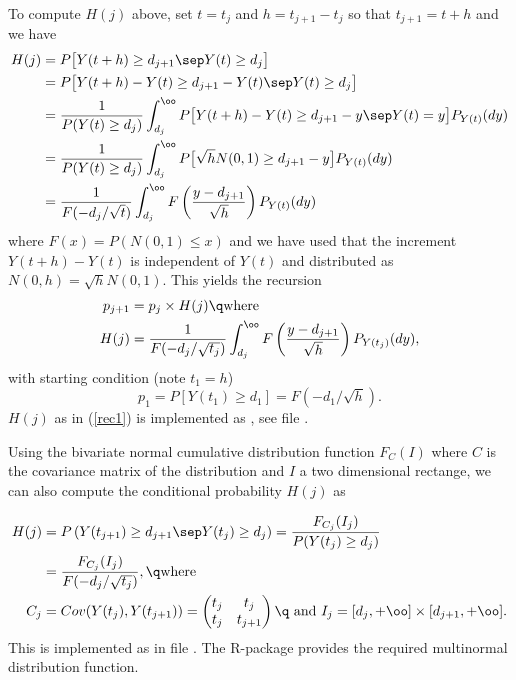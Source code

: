 To compute $H(j)$ above, set $t=t_j$ and $h=t_{j+1}-t_j$ so that
$t_{j+1}=t+h$ and we have
%
\begin{align*}
H(j) &=
P\big[Y(t+h)\geq d_{j+1}\sep Y(t)\geq d_j\big] \\&=
P\big[Y(t+h)-Y(t)\geq d_{j+1}-Y(t)\sep Y(t)\geq d_j\big] 
\\&=
\frac{1}{P(Y(t)\geq d_j)}
\int_{d_j}^\oo P\big[Y(t+h)-Y(t)\geq d_{j+1}-y\sep Y(t)=y\big]P_{Y(t)}(dy) 
\\&=
\frac{1}{P(Y(t)\geq d_j)}
\int_{d_j}^\oo P\big[\sqrt hN(0,1)\geq d_{j+1}-y\big]P_{Y(t)}(dy) 
\\&=
\frac{1}{F(-d_j/\sqrt{t})}
\int_{d_j}^\oo F\left(\frac{y-d_{j+1}}{\sqrt h}\right)P_{Y(t)}(dy)
\end{align*}
%
where $F(x)=P(N(0,1)\leq x)$ and we have used that the increment $Y(t+h)-Y(t)$ 
is independent of $Y(t)$ and distributed as $N(0,h)=\sqrt h N(0,1)$.
This yields the recursion
%
\begin{align}
\label{rec0}
p_{j+1} &= p_j\times H(j)\q\text{where}\\\label{rec1}
H(j) &= \frac{1}{F(-d_j/\sqrt{t_j})}
\int_{d_j}^\oo F\left(\frac{y-d_{j+1}}{\sqrt h}\right)P_{Y(t_j)}(dy),
\end{align}
%
with starting condition (note $t_1=h$)
%
\begin{equation}
\label{rec2}
p_1=P[Y(t_1)\geq d_1]=F(-d_1/\sqrt h).
\end{equation}
%
$H(j)$ as in (\ref{rec1}) is implemented as , see file
.

Using the bivariate normal cumulative distribution function $F_C(I)$
where $C$ is the covariance matrix of the distribution and $I$ a two dimensional 
rectange, we can also compute the conditional probability $H(j)$ as

%
\begin{align} 
\notag 
H(j) &=
P\left(Y(t_{j+1})\geq d_{j+1}\sep Y(t_j)\geq d_j\right)=
\frac{F_{C_j}(I_j)}{P(Y(t_j)\geq d_j)}
\\\label{Hj1}&=
\frac{F_{C_j}(I_j)}{F(-d_j/\sqrt{t_j})},
\q\text{where}\\
C_j&=Cov(Y(t_j),Y(t_{j+1}))=
\begin{pmatrix}
t_j & t_j\\
t_j & t_{j+1}
\end{pmatrix}
\q\text{ and }
I_j = [d_j,+\oo]\times[d_{j+1},+\oo].
\end{align}
%
This is implemented as  in file .
The R-package  provides the required multinormal distribution
function.

